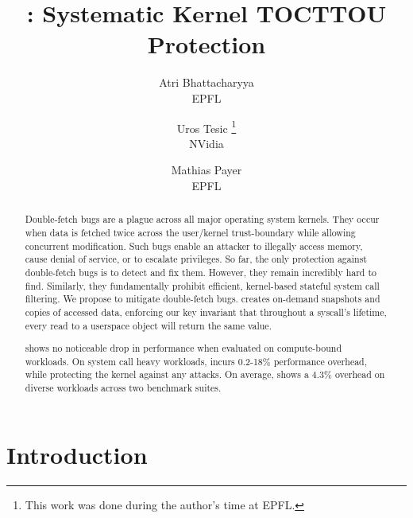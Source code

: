 \documentclass[letterpaper,twocolumn,10pt]{article}
\begin{document}
\date{}

\title{\Large \bf \tiktok: Systematic Kernel TOCTTOU Protection}

\author{
{\rm Atri Bhattacharyya} \\
EPFL
\and
{\rm Uros Tesic} \thanks{This work was done during the author's time at EPFL.}\\
NVidia
\and
{\rm Mathias Payer}\\
EPFL
} %
\maketitle

\begin{abstract}
Double-fetch bugs are a plague across all major operating system kernels. They
occur when data is fetched twice across the user/kernel trust-boundary while 
allowing concurrent modification. Such bugs enable an attacker to illegally 
access memory, cause denial of service, or to escalate privileges. 
%
So far, the only protection against double-fetch bugs is to detect and fix them.
However, they remain incredibly hard to find. 
%
Similarly,
they fundamentally prohibit efficient, kernel-based stateful system call filtering.
We propose \tiktok to mitigate double-fetch bugs. \tiktok creates on-demand
snapshots and copies of accessed data, enforcing our key invariant
that throughout a syscall's lifetime, every read to a userspace object 
will return the same value.

\tiktok shows no noticeable drop in performance when evaluated on compute-bound
workloads. On system call heavy workloads, \tiktok incurs 0.2-18\%
performance overhead, while protecting the kernel
against any \tocttou attacks. On average, \tiktok shows a $4.3\%$ overhead on
diverse workloads across two benchmark suites.

\end{abstract}

\section{Introduction}
\end{document}
